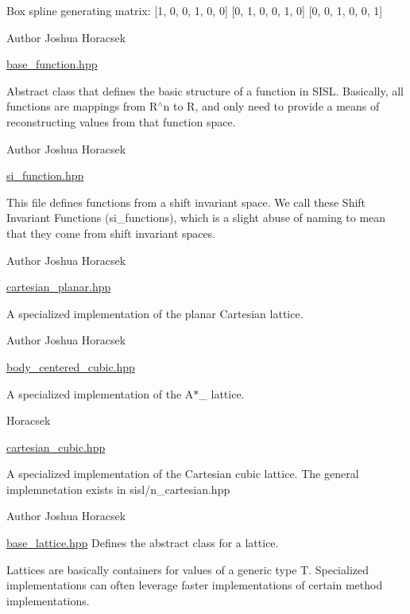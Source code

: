 Box spline generating matrix\+: \mbox{[}1, 0, 0, 1, 0, 0\mbox{]} \mbox{[}0, 1, 0, 0, 1, 0\mbox{]} \mbox{[}0, 0, 1, 0, 0, 1\mbox{]}

\begin{DoxyAuthor}{Author}
Joshua Horacsek
\end{DoxyAuthor}
\hyperlink{base__function_8hpp_source}{base\+\_\+function.\+hpp}

Abstract class that defines the basic structure of a function in S\+I\+SL. Basically, all functions are mappings from R$^\wedge$n to R, and only need to provide a means of reconstructing values from that function space.

\begin{DoxyAuthor}{Author}
Joshua Horacsek
\end{DoxyAuthor}
\hyperlink{si__function_8hpp_source}{si\+\_\+function.\+hpp}

This file defines functions from a shift invariant space. We call these Shift Invariant Functions (si\+\_\+functions), which is a slight abuse of naming to mean that they come from shift invariant spaces.

\begin{DoxyAuthor}{Author}
Joshua Horacsek
\end{DoxyAuthor}
\hyperlink{cartesian__planar_8hpp_source}{cartesian\+\_\+planar.\+hpp}

A specialized implementation of the planar Cartesian lattice.

\begin{DoxyAuthor}{Author}
Joshua Horacsek
\end{DoxyAuthor}
\hyperlink{body__centered__cubic_8hpp_source}{body\+\_\+centered\+\_\+cubic.\+hpp}

A specialized implementation of the A$\ast$\+\_ lattice.

Horacsek

\hyperlink{cartesian__cubic_8hpp_source}{cartesian\+\_\+cubic.\+hpp}

A specialized implementation of the Cartesian cubic lattice. The general implemnetation exists in sisl/n\+\_\+cartesian.\+hpp

\begin{DoxyAuthor}{Author}
Joshua Horacsek
\end{DoxyAuthor}
\hyperlink{base__lattice_8hpp_source}{base\+\_\+lattice.\+hpp} Defines the abstract class for a lattice.

Lattices are basically containers for values of a generic type T. Specialized implementations can often leverage faster implementations of certain method implementations.

